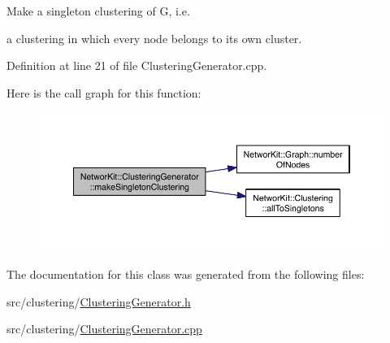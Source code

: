 Make a singleton clustering of G, i.\-e. 

a clustering in which every node belongs to its own cluster. 

Definition at line 21 of file Clustering\-Generator.\-cpp.



Here is the call graph for this function\-:\nopagebreak
\begin{figure}[H]
\begin{center}
\leavevmode
\includegraphics[width=350pt]{class_networ_kit_1_1_clustering_generator_a0a9dc09f93d77c77562792b3537cf6c1_cgraph}
\end{center}
\end{figure}




The documentation for this class was generated from the following files\-:\begin{DoxyCompactItemize}
\item 
src/clustering/\hyperlink{_clustering_generator_8h}{Clustering\-Generator.\-h}\item 
src/clustering/\hyperlink{_clustering_generator_8cpp}{Clustering\-Generator.\-cpp}\end{DoxyCompactItemize}
